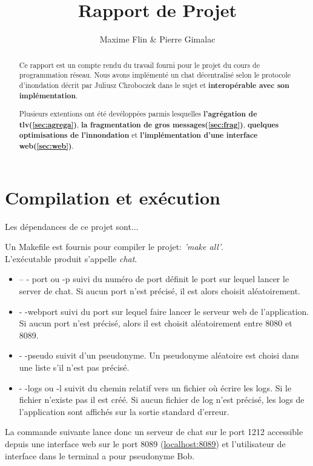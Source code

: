 \documentclass[a4paper,10pt]{article} %
\author{Maxime Flin \& Pierre Gimalac}
\title{Rapport de Projet}
\begin{document}
\maketitle

\begin{abstract}
  Ce rapport est un compte rendu du travail fourni pour le projet du cours de programmation réseau. Nous avons implémenté un chat décentralisé selon le protocole d'inondation décrit par Juliusz Chroboczek dans le sujet et \textbf{interopérable avec son implémentation}.

  Plusieurs extentions ont été devéloppées parmis lesquelles \textbf{l'agrégation de tlv(\ref{sec:agrega})}, \textbf{la fragmentation de gros messages(\ref{sec:frag})}, \textbf{quelques optimisations de l'innondation} et \textbf{l'implémentation d'une interface web(\ref{sec:web})}.
\end{abstract}

\section{Compilation et exécution\label{sec:exec}}
Les dépendances de ce projet sont...

Un \textrm{Makefile} est fournis pour compiler le projet:  \textit{'make all'}.\\

L'exécutable produit s'appelle \textit{chat}.
\begin{itemize}
\item \textrm{-- - port} ou \textrm{-p} suivi du numéro de port définit le port sur lequel lancer le server de chat. Si aucun port n'est précisé, il est alors choisit aléatoirement.
\item \textrm{- -webport} suivi du port sur lequel faire lancer le serveur web de l'application. Si aucun port n'est précisé, alors il est choisit aléatoirement entre 8080 et 8089.
\item \textrm{- -pseudo} suivit d'un pseudonyme. Un pseudonyme aléatoire est choisi dans une liste s'il n'est pas précisé.
\item \textrm{- -logs} ou \textrm{-l} suivit du chemin relatif vers un fichier où écrire les logs. Si le fichier n'existe pas il est créé. Si aucun fichier de log n'est précisé, les logs de l'application sont affichés sur la sortie standard d'erreur.
\end{itemize}

La commande suivante lance donc un serveur de chat sur le port 1212 accessible depuis une interface web sur le port 8089 (\href{localhost:8089}{localhost:8089}) et l'utilisateur de interface dans le terminal a pour pseudonyme Bob.
\end{document}
